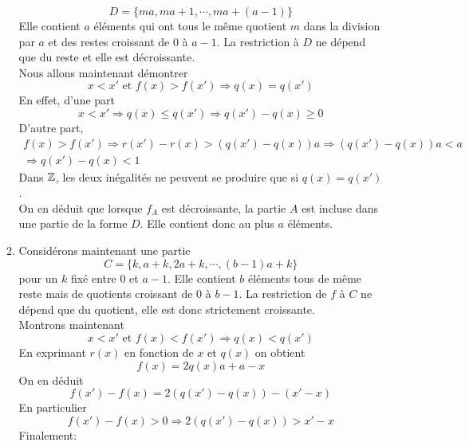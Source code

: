 \begin{enumerate}
\begin{enumerate}
\begin{displaymath}
 D = \{ma,ma+1, \cdots,ma +(a-1)\}
\end{displaymath}
Elle contient $a$ éléments qui ont tous le même quotient $m$ dans la division par $a$ et des restes croissant de $0$ à $a-1$. La restriction à $D$ ne dépend que du reste et elle est décroissante.\\
Nous allons maintenant démontrer
\begin{displaymath}
 x<x' \text{ et } f(x) > f(x') \Rightarrow q(x)=q(x')
\end{displaymath}
En effet, d'une part
\begin{displaymath}
 x<x' \Rightarrow q(x)\leq q(x') \Rightarrow q(x')-q(x) \geq 0
\end{displaymath}
D'autre part,
\begin{multline*}
 f(x)>f(x') \Rightarrow r(x')-r(x) > (q(x')-q(x))a
\Rightarrow (q(x')-q(x))a < a \\
\Rightarrow q(x')-q(x) < 1
\end{multline*}
Dans $\mathbb{Z}$, les deux inégalités ne peuvent se produire que si $q(x)=q(x')$.\\
On en déduit que lorsque $f_A$ est décroissante, la partie $A$ est incluse dans une partie de la forme $D$. Elle contient donc au plus $a$ éléments.
\item Considérons maintenant une partie 
\begin{displaymath}
 C = \{k, a+k, 2a+k,\cdots ,(b-1)a+k\}
\end{displaymath}
pour un $k$ fixé entre $0$ et $a-1$. Elle contient $b$ éléments tous de même reste mais de quotients croissant de $0$ à $b-1$. La restriction de $f$ à $C$ ne dépend que du quotient, elle est donc strictement croissante.\\ Montrons maintenant
\begin{displaymath}
 x<x' \text{ et } f(x) < f(x') \Rightarrow q(x) < q(x')
\end{displaymath}
En exprimant $r(x)$ en fonction de $x$ et $q(x)$ on obtient
\begin{displaymath}
 f(x) = 2q(x)a + a - x
\end{displaymath}
On en déduit
\begin{displaymath}
 f(x')-f(x)= 2(q(x')-q(x)) -(x'-x)
\end{displaymath}
En particulier
\begin{displaymath}
 f(x')-f(x)>0 \Rightarrow 2(q(x')-q(x)) > x'-x
\end{displaymath}
Finalement:
\begin{displaymath}

\end{displaymath}
\end{enumerate}
\end{enumerate}
